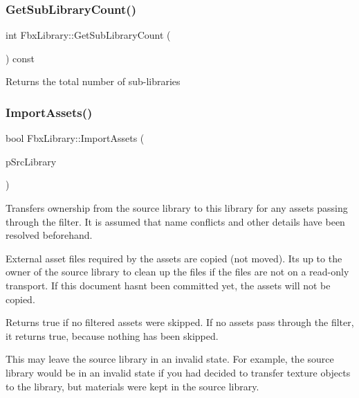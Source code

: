 \subsubsection{\texorpdfstring{Get\+Sub\+Library\+Count()}{GetSubLibraryCount()}}
{\footnotesize\ttfamily int Fbx\+Library\+::\+Get\+Sub\+Library\+Count (\begin{DoxyParamCaption}\item[{void}]{ }\end{DoxyParamCaption}) const}



Returns the total number of sub-\/libraries 

\mbox{\label{class_fbx_library_a1b1dd291ec8d1858225190ae40600581}} 
\subsubsection{\texorpdfstring{Import\+Assets()}{ImportAssets()}\hspace{0.1cm}{\footnotesize\ttfamily [1/2]}}
{\footnotesize\ttfamily bool Fbx\+Library\+::\+Import\+Assets (\begin{DoxyParamCaption}\item[{\hyperlink{class_fbx_library}{Fbx\+Library} $\ast$}]{p\+Src\+Library }\end{DoxyParamCaption})}

Transfers ownership from the source library to this library for any assets passing through the filter. It is assumed that name conflicts and other details have been resolved beforehand.

External asset files required by the assets are copied (not moved). It\textquotesingle{}s up to the owner of the source library to clean up the files if the files are not on a read-\/only transport. If this document hasn\textquotesingle{}t been committed yet, the assets will not be copied.

Returns true if no filtered assets were skipped. If no assets pass through the filter, it returns true, because nothing has been skipped.

This may leave the source library in an invalid state. For example, the source library would be in an invalid state if you had decided to transfer texture objects to the library, but materials were kept in the source library.

